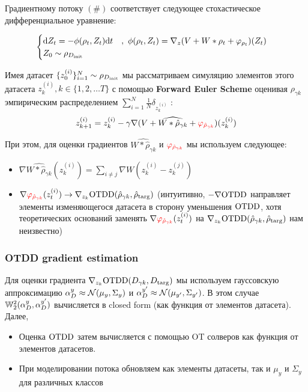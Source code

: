 Градиентному потоку $(\#)$ соответствует следующее стохастическое дифференциальное уравнение:

\begin{gather*}
    \begin{cases}
        \text{d} Z_t = - \phi(\rho_t, Z_t) \text{d} t \quad , \,\, \phi(\rho_t, Z_t) = \nabla_{z} (V + W * \rho_t + \varphi_{\rho_t})(Z_t)\\
        Z_0 \sim \rho_{D_{\text{init}}}
    \end{cases}
\end{gather*}

Имея датасет $\{z_{0}^{(i)}\}_{i = 1}^{N} \sim \rho_{D_{\text{init}}}$ мы рассматриваем симуляцию элементов этого датасета $z_{k}^{(i)}, k \in \{ 1, 2, \dots T \}$ с помощью \textbf{Forward Euler Scheme} оценивая $\rho_{\gamma k}$ эмпирическим распределением $\sum_{i = 1}^{N}\frac{1}{N}\delta_{z_{k}^{(i)}}$ : 
\begin{gather*}
    z_{k + 1}^{(i)} = z_{k}^{(i)} - \gamma \nabla (V + \widehat{W * \hat{\rho}_{\gamma k}} + {\color{red} \varphi_{\hat{\rho}_{\gamma k}}} ) (z_{k}^{(i)})
\end{gather*}

При этом, для оценки градиентов $\widehat{W * \hat{\rho}_{\gamma k}}$ и ${\color{red} \varphi_{\hat{\rho}_{\gamma k}}}$ мы используем следующее: 
\begin{itemize}
    \item $\nabla \widehat{W * \hat{\rho}_{\gamma k}}(z_{k}^{(i)}) = \sum_{i \neq j} \nabla W(z_{k}^{(i)} - z_{k}^{(j)})$
    \item $\nabla {\color{red} \varphi_{\hat{\rho}_{\gamma k}}}(z_{t}^{(i)}) \rightarrow \nabla_{z_k} \text{OTDD}(\hat{\rho}_{\gamma k}, \hat{\rho}_{\text{targ}})$ (интуитивно, $-\nabla \text{OTDD}$ направляет элементы изменяющегося датасета в сторону уменьшения $\text{OTDD}$, хотя теоретических оснований заменять $\nabla {\color{red} \varphi_{\hat{\rho}_{\gamma k}}}(z_{t}^{(i)})$ на $\nabla_{z_k} \text{OTDD}(\hat{\rho}_{\gamma k}, \hat{\rho}_{\text{targ}})$ нам неизвестно)
\end{itemize}

\subsubsection{OTDD gradient estimation}

Для оценки градиента $ \nabla_{z_k} \text{OTDD}(D_{\gamma k}, D_{\text{targ}})$ мы используем гауссовскую аппроксимацию $\alpha_D^y \approx \mathcal{N}(\mu_y, \Sigma_y)$ и $\alpha_D^{y'} \approx \mathcal{N}(\mu_{y'}, \Sigma_{y'})$. В этом случае $\mathbb{W}_2^2(\alpha_D^y, \alpha_D^{y'})$ вычисляется в closed form (как функция от элементов датасета). Далее, 
\begin{itemize}
    \item Оценка $\text{OTDD}$ затем вычисляется с помощью OT солверов как функция от элементов датасетов.
    \item При моделировании потока обновляем как элементы датасеты, так и $\mu_y$ и $\Sigma_y$ для различных классов
\end{itemize}

